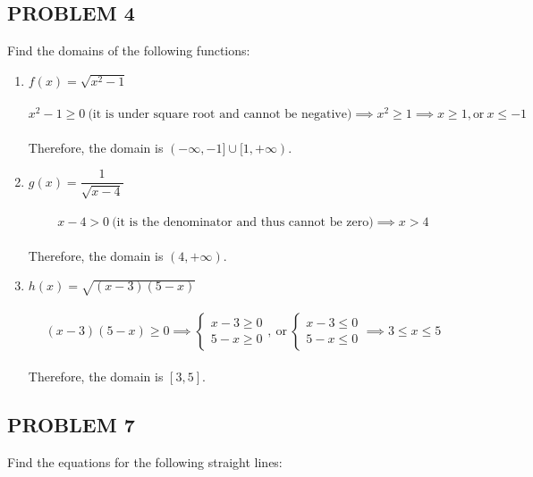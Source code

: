 \documentclass{article}
\begin{document}
\subsection*{PROBLEM 4}
\vspace{1em}
Find the domains of the following functions:
\vspace{1em}
\begin{enumerate}[label=(\alph*),itemsep=4ex,partopsep=1ex]
\item $f(x)=\sqrt{x^2 - 1}$ \\\\
\begin{equation*}
    x^2 - 1 \geq 0\ \textrm{(it is under square root and cannot be negative)} \implies x^2 \geq 1 \implies x \geq 1, \textrm{or}\ x \leq -1
\end{equation*}
\\Therefore, the domain is $(-\infty, -1]\cup[1, +\infty)$.

\item $g(x)=\dfrac{1}{\sqrt{x - 4}}$ \\\\
\begin{equation*}
    x - 4 > 0\ \textrm{(it is the denominator and thus cannot be zero)} \implies x > 4
\end{equation*}
\\Therefore, the domain is $(4, +\infty)$.

\item $h(x)=\sqrt{(x-3)(5-x)}$ \\\\
\begin{equation*}
    (x-3)(5-x) \geq 0 \implies
        \begin{cases} x-3 \geq 0\\5-x \geq 0 \end{cases},\ 
        \textrm{or} \
        \begin{cases} x-3 \leq 0\\5-x \leq 0 \end{cases}
        \implies 3 \leq x \leq 5
\end{equation*}
\\Therefore, the domain is $[3, 5]$.
\end{enumerate}


\subsection*{PROBLEM 7}
\vspace{1em}
Find the equations for the following straight lines:
\vspace{1em}
\end{document}
